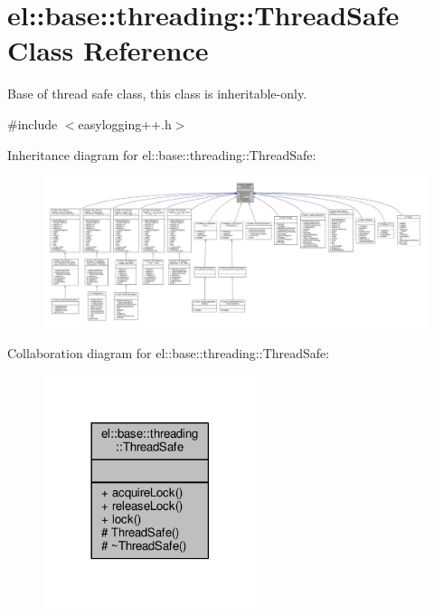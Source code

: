 \hypertarget{classel_1_1base_1_1threading_1_1ThreadSafe}{}\section{el\+:\+:base\+:\+:threading\+:\+:Thread\+Safe Class Reference}
\label{classel_1_1base_1_1threading_1_1ThreadSafe}


Base of thread safe class, this class is inheritable-\/only.  




{\ttfamily \#include $<$easylogging++.\+h$>$}



Inheritance diagram for el\+:\+:base\+:\+:threading\+:\+:Thread\+Safe\+:
\nopagebreak
\begin{figure}[H]
\begin{center}
\leavevmode
\includegraphics[width=350pt]{db/d80/classel_1_1base_1_1threading_1_1ThreadSafe__inherit__graph}
\end{center}
\end{figure}


Collaboration diagram for el\+:\+:base\+:\+:threading\+:\+:Thread\+Safe\+:
\nopagebreak
\begin{figure}[H]
\begin{center}
\leavevmode
\includegraphics[width=177pt]{d3/d9a/classel_1_1base_1_1threading_1_1ThreadSafe__coll__graph}
\end{center}
\end{figure}
